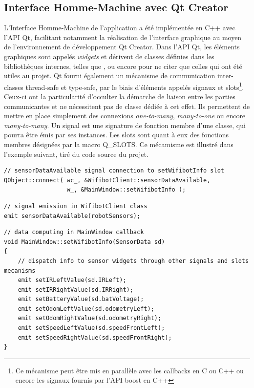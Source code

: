   \subsection{Interface Homme-Machine avec Qt Creator}
  \label{subsection:Qt}
  
L'Interface Homme-Machine de l'application a été implémentée en C++ avec l'\gls{API} Qt, facilitant notamment la réalisation de l'interface graphique au moyen de l'environnement de développement Qt Creator. 
Dans l'\gls{API} Qt, les éléments graphiques sont appelés \emph{widgets} et dérivent de classes définies dans les bibliothèques internes, telles que ,  ou encore  pour ne citer 
que celles qui ont été utiles au projet.  
Qt fourni également un mécanisme de communication inter-classes thread-safe et type-safe, par le biais d'éléments appelés signaux et 
slots\footnote{Ce mécanisme peut être mis en parallèle avec les callbacks en C ou C++ ou encore les signaux fournis par l'API boost en C++}.
Ceux-ci ont la particularité d'occulter la démarche de liaison entre les parties communicantes et ne nécessitent pas de classe dédiée à cet effet. 
Ils permettent de mettre en place simplement des connexions \emph{one-to-many}, \emph{many-to-one} ou encore \emph{many-to-many}.
Un signal est une signature de fonction membre d'une classe, qui pourra être émis par ses instances. Les slots sont quant à eux des fonctions membres désignées par la macro Q\_SLOTS. 
Ce mécamisme est illustré dans l'exemple suivant, tiré du code source du projet. 

\begin{lstlisting}[style=customcpp]
// sensorDataAvailable signal connection to setWifibotInfo slot
QObject::connect( wc_, &WifibotClient::sensorDataAvailable, 
				  w_, &MainWindow::setWifibotInfo );
\end{lstlisting}

\begin{lstlisting}[style=customcpp]
// signal emission in WifibotClient class
emit sensorDataAvailable(robotSensors);
\end{lstlisting}

\begin{lstlisting}[style=customcpp]
// data computing in MainWindow callback
void MainWindow::setWifibotInfo(SensorData sd)
{
    // dispatch info to sensor widgets through other signals and slots mecanisms
    emit setIRLeftValue(sd.IRLeft);
    emit setIRRightValue(sd.IRRight);
    emit setBatteryValue(sd.batVoltage);
    emit setOdomLeftValue(sd.odometryLeft);
    emit setOdomRightValue(sd.odometryRight);
    emit setSpeedLeftValue(sd.speedFrontLeft);
    emit setSpeedRightValue(sd.speedFrontRight);
}
\end{lstlisting}

